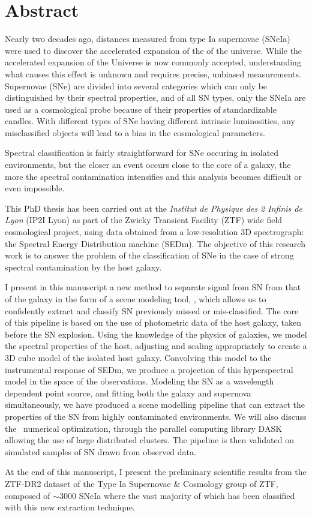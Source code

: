 \documentclass[../main/main.tex]{subfiles}
\begin{document}
\chapter*{Abstract}
\label{chap:abstract}
\vspace{2cm}
Nearly two decades ago, distances measured from type Ia supernovae 
(SNeIa) were used to discover the accelerated expansion of the
of the universe. While the accelerated expansion of the Universe is now
commonly accepted, understanding what causes this effect is unknown
and requires precise, unbiased measurements. 
Supernovae (SNe) are divided into several categories which can only be
distinguished by their spectral properties, and of all SN types, only the SNeIa
are used as a cosmological probe because of their properties of
standardizable candles. With different types of SNe
having different intrinsic luminosities,
any misclassified objects will lead to a bias in the cosmological
parameters.  

Spectral classification is fairly straightforward for SNe occuring in
isolated environments, but the closer an event occurs close to the core of a
galaxy, the more the spectral contamination intensifies and this analysis
becomes difficult or even impossible.

This PhD thesis has been carried out at the \textit{Institut de Physique des 2
Infinis de Lyon} (IP2I Lyon) as part of the Zwicky Transient Facility (ZTF) wide field cosmological
project, using data obtained from a low-resolution 3D
spectrograph: the Spectral Energy Distribution machine
(SEDm). The objective of this research work is to answer the
problem of the classification of SNe in the case of strong spectral contamination by the host galaxy. 

I present in this manuscript a new method to separate signal from SN
from that of the galaxy in the form
of a scene modeling tool, \hypergal, which allows us to confidently
extract and classify SN previously missed or mis-classified. The core of
this pipeline is based on the use of
photometric data of the host galaxy, taken before the
SN explosion. Using the knowledge of the physics of galaxies, we model
the spectral properties of the host, adjusting and scaling appropriately
to create a 3D cube model of the
isolated host galaxy. Convolving this model to the instrumental response
of SEDm, we produce a projection of this hyperspectral model in the
space of the observations. Modeling the SN as a wavelength dependent
point source, and fitting both the galaxy and supernova simultaneously,
we have produced a scene modelling pipeline that can extract the
properties of the SN from highly contaminated environments. We will also
discuss the \hypergal\ numerical optimization, through the parallel
computing library DASK allowing the use of large distributed clusters.
The pipeline is then validated on simulated samples of SN drawn from observed
data.

At the end of this manuscript, I present the preliminary scientific results from the
ZTF-DR2 dataset of the Type Ia Supernovae $\&$ Cosmology group
of ZTF, composed of $\sim3000$ SNeIa where the vast majority of which has been classified with this
new extraction technique.
\end{document}
